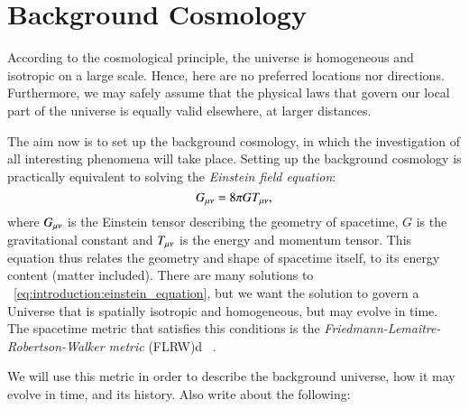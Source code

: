 \section{Background Cosmology}\label{sec:m1}

According to the cosmological principle, the universe is homogeneous and isotropic on a large scale. Hence, here are no preferred locations nor directions. Furthermore, we may safely assume that the physical laws that govern our local part of the universe is equally valid elsewhere, at larger distances. 

The aim now is to set up the background cosmology, in which the investigation of all interesting phenomena will take place. Setting up the background cosmology is practically equivalent to solving the \textit{Einstein field equation}:
\begin{equation}\label{eq:introduction:einstein_equation}
    G_{\mu\nu} = 8\pi GT_{\mu\nu},
\end{equation}
where $G_{\mu\nu}$ is the Einstein tensor describing the geometry of spacetime, $G$ is the gravitational constant and $T_{\mu\nu}$ is the energy and momentum tensor. This equation thus relates the geometry and shape of spacetime itself, to its energy content (matter included). There are many solutions to ~\cref{eq:introduction:einstein_equation}, but we want the solution to govern a Universe that is spatially isotropic and homogeneous, but may evolve in time. The spacetime metric that satisfies this conditions is the \textit{Friedmann-Lemaître-Robertson-Walker metric} (FLRW)d ~\cite[ch. 8]{carroll_2019}.

We will use this metric in order to describe the background universe, how it may evolve in time, and its history. 
Also write about the following:





